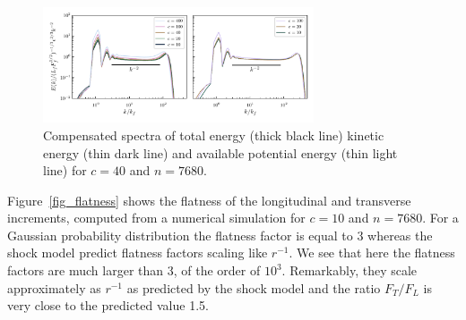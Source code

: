 \begin{figure}
\centerline{\includegraphics[width=8cm]{../Pyfig/fig_spectra}}
\caption{Compensated spectra
of total energy (thick black line)
kinetic energy (thin dark line) and
available potential energy (thin light line)
for $c = 40$ and $n = 7680$.}
\label{fig_spectra_c40}
\end{figure}
%
Figure~\ref{fig_flatness} shows the flatness of the longitudinal and
transverse increments, computed from a numerical simulation for $c =
10$ and $n = 7680$.
%
For a Gaussian probability distribution the flatness factor is equal
to 3 whereas the shock model predict flatness factors scaling like
$r^{-1}$.
%
We see that here the flatness factors are much larger than 3, of the
order of $10^3$.
%
Remarkably, they scale approximately as $r^{-1}$ as predicted by the
shock model and the ratio $F_T/F_L$ is very close to the predicted
value 1.5.



